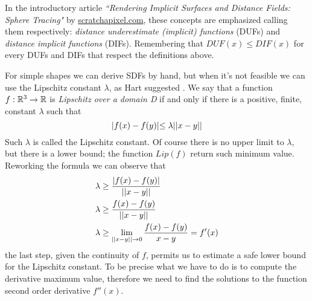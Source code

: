 In the introductory article
\emph{``Rendering Implicit Surfaces and Distance Fields: Sphere Tracing"}\cite{scratch_sdf}
by \url{scratchapixel.com},
these concepts are emphasized calling them respectively: 
\emph{distance underestimate (implicit) functions} (DUFs) and 
\emph{distance implicit functions} (DIFs).
Remembering that $DUF(x) \leq DIF(x)$ for every DUFs and DIFs that respect the definitions above.



For simple shapes we can derive SDFs by hand, but when it's not feasible we can use the Lipschitz constant $\lambda$, as Hart suggested \cite{hart1996}.
We say that a function $f : \mathbb{R}^3 \to \mathbb{R}$ is \emph{Lipschitz over a domain D} if and only if there is a positive, finite, constant $\lambda$ such that
$$
\lvert f(x) - f(y) \lvert \leq \lambda \lvert\lvert x - y \lvert\lvert
$$
Such $\lambda$ is called the Lipschitz constant.
Of course there is no upper limit to $\lambda$, but there is a lower bound; the function $Lip(f)$ return such minimum value.
Reworking the formula we can observe that
\begin{align*}
  \lambda &\geq \dfrac{\lvert f(x) - f(y) \lvert}{\lvert\lvert x - y \lvert\lvert} \\
  \lambda &\geq \dfrac{f(x) - f(y)}{\lvert\lvert x - y \lvert\lvert}\\
  \lambda &\geq \lim_{\lvert\lvert x-y \lvert\lvert \to 0} \dfrac{f(x) - f(y)}{x - y} = f'(x)
\end{align*}
the last step, given the continuity of $f$, permits us to estimate a safe lower bound for the Lipschitz constant.
To be precise what we have to do is to compute the derivative maximum value, therefore we need to find the solutions to the function second order derivative $f''(x)$.

